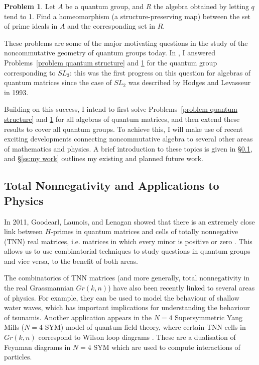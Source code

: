 \documentclass[11pt]{amsart}
\theoremstyle{definition}
\newtheorem{problem}{Problem}
\numberwithin{equation}{theorem}
\begin{document}
\begin{problem}\label{problem homeomorphism}
Let $A$ be a quantum group, and $R$ the algebra obtained by letting $q$ tend to 1. Find a homeomorphism (a structure-preserving map) between the set of prime ideals in $A$ and the corresponding set in $R$.
\end{problem}

These problems are some of the major motivating questions in the study of the noncommutative geometry of quantum groups today.  In \cite{Me2}, I answered Problems~\ref{problem quantum structure} and \ref{problem homeomorphism} for the quantum group corresponding to $SL_3$: this was the first progress on this question for algebras of quantum matrices since the case of $SL_2$ was described by Hodges and Levasseur in 1993.

Building on this success, I intend to first solve Problems~\ref{problem quantum structure} and \ref{problem homeomorphism} for all algebras of quantum matrices, and then extend these results to cover all quantum groups.  To achieve this, I will make use of recent exciting developments connecting noncommutative algebra to several other areas of mathematics and physics.  A brief introduction to these topics is given in \S\ref{s:physics}, and \S\ref{ss:my work} outlines my existing and planned future work.


\subsection{Total Nonnegativity and Applications to Physics}\label{s:physics} In 2011, Goodearl, Launois, and Lenagan showed that there is an extremely close link between $H$-primes in quantum matrices and cells of totally nonnegative (TNN) real matrices, i.e. matrices in which every minor is positive or zero \cite{GLL}.  This allows us to use combinatorial techniques to study questions in quantum groups and vice versa, to the benefit of both areas. 

The combinatorics of TNN matrices (and more generally, total nonnegativity in the real Grassmannian $Gr(k,n)$) have also been recently linked to several areas of physics. For example, they can be used to model the behaviour of shallow water waves, which has important implications for understanding the behaviour of tsunamis. Another application appears in the $N=4$ Supersymmetric Yang Mills ($N=4$ SYM) model of quantum field theory, where certain TNN cells in $Gr(k,n)$ correspond to Wilson loop diagrams \cite{agarwala}.  These are a dualisation of Feynman diagrams in $N=4$ SYM which are used to compute interactions of particles.
\end{document}
